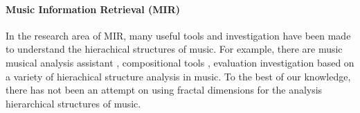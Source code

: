 \documentclass[acmsmall,review,anonymous]{acmart}\settopmatter{printfolios=true,printccs=false,printacmref=false}
\begin{document}
\paragraph{Music Information Retrieval (MIR)}
In the research area of MIR, many
useful tools and investigation have been made to understand the hierachical
structures of music. For example, there are music musical analysis assistant \cite{hamanaka2009interactive, hamanaka2005atta}, compositional tools
\cite{hamanaka2004automatic, hamanaka2005automatic}, evaluation investigation \cite{mcfee2017evaluating, mcfee2015hierarchical} based on a variety of hierachical
structure analysis in music. To the best of our knowledge, there has not been an
attempt on using fractal dimensions for the analysis hierarchical structures of
music.  




\end{document}
